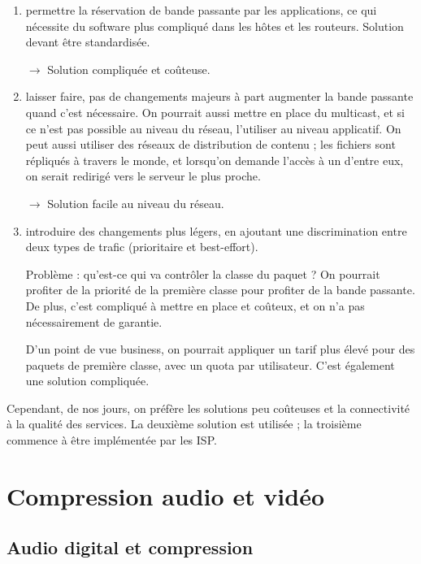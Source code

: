 			\begin{enumerate}
				\item permettre la réservation de bande passante par les applications, ce qui nécessite du software plus compliqué dans les hôtes et les routeurs. Solution devant être standardisée.
			
				$\rightarrow$ Solution compliquée et coûteuse.
			
				\item laisser faire, pas de changements majeurs à part augmenter la bande passante quand c'est nécessaire. On pourrait aussi mettre en place du multicast, et si ce n'est pas possible au niveau du réseau, l'utiliser au niveau applicatif. On peut aussi utiliser des réseaux de distribution de contenu ; les fichiers sont répliqués à travers le monde, et lorsqu'on demande l'accès à un d'entre eux, on serait redirigé vers le serveur le plus proche.
			
				$\rightarrow$ Solution facile au niveau du réseau.
			
				\item introduire des changements plus légers, en ajoutant une discrimination entre deux types de trafic (prioritaire et best-effort).
			
				Problème : qu'est-ce qui va contrôler la classe du paquet ? On pourrait profiter de la priorité de la première classe pour profiter de la bande passante. De plus, c'est compliqué à mettre en place et coûteux, et on n'a pas nécessairement de garantie.
			
				D'un point de vue business, on pourrait appliquer un tarif plus élevé pour des paquets de première classe, avec un quota par utilisateur. C'est également une solution compliquée.
			
			\end{enumerate}
		
			Cependant, de nos jours, on préfère les solutions peu coûteuses et la connectivité à la qualité des services. La deuxième solution est utilisée ; la troisième commence à être implémentée par les ISP.
		
	\section{Compression audio et vidéo}
		\subsection{Audio digital et compression}
		
